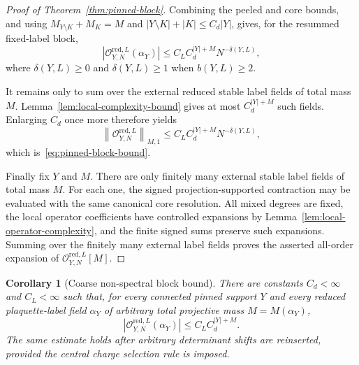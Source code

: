 \documentclass[11pt,a4paper,reqno]{amsart}
\newtheorem{corollary}[theorem]{Corollary}
\theoremstyle{definition}
\theoremstyle{remark}
\begin{document}
\begin{proof}[Proof of Theorem~\ref{thm:pinned-block}]
Combining the peeled and core bounds, and using
$M_{Y\setminus K}+M_K=M$ and
$|Y\setminus K|+|K|\le C_d|Y|$, gives, for the resummed fixed-label block,
\[
\left|\mathcal O_{Y,N}^{\mathrm{red},L}(\alpha_Y)\right|
\le
C_LC_d^{|Y|+M}N^{-\delta(Y,L)},
\]
where $\delta(Y,L)\ge0$ and $\delta(Y,L)\ge1$ when $b(Y,L)\ge2$.

It remains only to sum over the external reduced stable label fields of total mass $M$.  Lemma~\ref{lem:local-complexity-bound} gives at most $C_d^{|Y|+M}$ such fields.  Enlarging $C_d$ once more therefore yields
\[
\left\|\mathcal O_{Y,N}^{\mathrm{red},L}\right\|_{M,1}
\le
C_LC_d^{|Y|+M}N^{-\delta(Y,L)},
\]
which is~\eqref{eq:pinned-block-bound}.

Finally fix $Y$ and $M$.  There are only finitely many external stable label fields of total mass $M$.  For each one, the signed projection-supported contraction may be evaluated with the same canonical core resolution.  All mixed degrees are fixed, the local operator coefficients have controlled expansions by Lemma~\ref{lem:local-operator-complexity}, and the finite signed sums preserve such expansions.  Summing over the finitely many external label fields proves the asserted all-order expansion of $\mathcal O_{Y,N}^{\mathrm{red},L}[M]$.
\end{proof}

\begin{corollary}[Coarse non-spectral block bound]\label{cor:coarse-nonspectral-block}
There are constants $C_d<\infty$ and $C_L<\infty$ such that, for every connected pinned support $Y$ and every reduced plaquette-label field $\alpha_Y$ of arbitrary total projective mass
$M=M(\alpha_Y)$,
\begin{equation}\label{eq:coarse-nonspectral-block}
\left|\mathcal O_{Y,N}^{\mathrm{red},L}(\alpha_Y)\right|
\le C_LC_d^{|Y|+M}.
\end{equation}
The same estimate holds after arbitrary determinant shifts are reinserted, provided the central charge selection rule is imposed.
\end{corollary}
\end{document}
